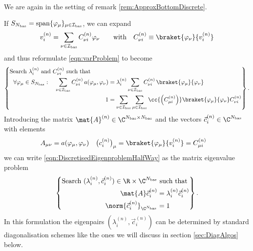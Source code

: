 \begin{rem}
	\label{rem:DiscreteFormulation}
	We are again in the setting of remark \ref{rem:ApproxBottomDiscrete}.

	\noindent
	If $S_{N_\text{bas}} = \operatorname{span} \{\varphi_\mu\}_{\mu \in \mathcal{I}_\text{bas}}$, we can expand
	\[ v^{(n)}_i = \sum_{\nu\in\Ibas} C^{(n)}_{\nu i} \varphi_\nu \qquad \text{with} \quad C^{(n)}_{\nu i} \equiv \braket{\varphi_\nu}{v^{(n)}_i} \]
	and thus reformulate \eqref{eqn:varProblem} to become
	\begin{equation}
		\label{eqn:DiscretisedEigenproblemHalfWay}
		\left\{
		\begin{aligned}
			\text{Search $\lambda_i^{(n)}$ and $C^{(n)}_{\nu i}$ such that} \hspace{30pt} & \\
			\forall \varphi_\mu \in S_{\Nbas}:
			\quad \sum_{\nu\in\Ibas} C^{(n)}_{\nu i} \, a(\varphi_\mu, \varphi_\nu)
			&= \lambda_i^{(n)} \sum_{\nu\in\Ibas} C^{(n)}_{\nu i} \, \braket{\varphi_\mu}{\varphi_\nu}\\
			1 &= 
			\sum_{\nu\in\Ibas} \sum_{\mu\in\Ibas} \cc{\left(C^{(n)}_{\mu i}\right)} \braket{\varphi_\mu}{\varphi_\nu} C^{(n)}_{\nu i}
		\end{aligned}
		\right\}.
	\end{equation}
	Introducing the matrix $\mat{A}^{(n)} \in \C^{\Nbas \times \Nbas}$
	and the vectors $\vec{c}^{(n)}_i \in \C^{\Nbas}$
	with elements
	\begin{align}
		\label{eqn:DiscretisationExpression}
		A_{\mu\nu} &= a(\varphi_\mu, \varphi_\nu) & \big(c^{(n)}_i\big)_\mu &= \braket{\varphi_\mu}{v^{(n)}_i} = C^{(n)}_{\mu i}
	\end{align}
	we can write \eqref{eqn:DiscretisedEigenproblemHalfWay}
	as the matrix eigenvalue problem
	\begin{equation}
		\left\{
			\begin{aligned}
				\text{Search $(\lambda_i^{(n)}, \vec{c}^{(n)}_i) \in \R \times \C^{\Nbas}$}& \text{ such that}\\
				\mat{A} \vec{c}^{(n)}_i &= \lambda_i^{(n)} \vec{c}^{(n)}_i \\
				\norm{\vec{c}^{(n)}_i}_{\C^{\Nbas}} &= 1
		\label{eqn:DiscretisedEigenproblem}
		\end{aligned}
		\right\}.
	\end{equation}
	In this formulation the eigenpairs $(\lambda_i^{(n)}, \vec{c}^{(n)}_i)$
	can be determined by standard diagonalisation schemes
	like the ones we will discuss in section \vref{sec:DiagAlgos} below.
\end{rem}

